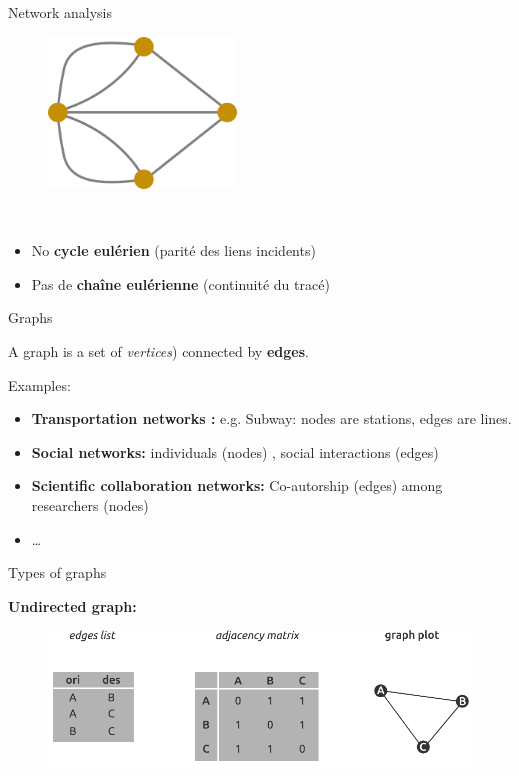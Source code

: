 \begin{frame}{Network analysis}

\begin{figure}
  \includegraphics[width=5cm]{Konigsberg_graph.png}
\end{figure}

~

\begin{itemize}
\item No \textbf{cycle eulérien} (parité des liens incidents)
\item Pas de \textbf{chaîne eulérienne} (continuité du tracé)
\end{itemize}


\end{frame}



\begin{frame}{Graphs}

A graph is a set of \textit{vertices}) connected by \textbf{edges}.



Examples:

\begin{itemize} 
  \item \textbf{Transportation networks  :} e.g. Subway: nodes are  stations,  edges are lines.
  \item \textbf{Social networks:} individuals (nodes) , social interactions (edges)
  \item \textbf{Scientific collaboration networks:} Co-autorship (edges) among researchers (nodes)
  \item \ldots
\end{itemize}

\end{frame}




\begin{frame}{Types of graphs}

\textbf{Undirected graph:}

\begin{figure}
  \includegraphics[width=12cm]{MatGraph3_EN.pdf}
\end{figure}

\end{frame}


